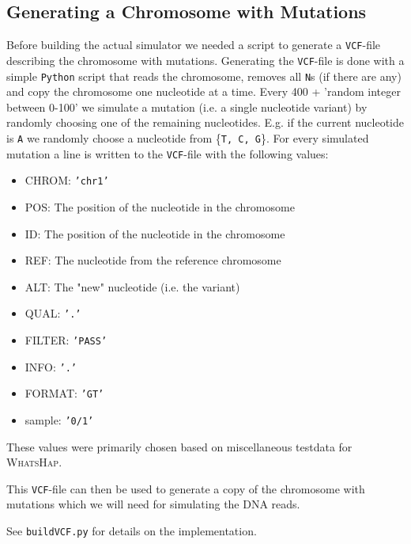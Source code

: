 \documentclass[10pt,a4paper]{article}
\begin{document}
\subsection{Generating a Chromosome with Mutations}
Before building the actual simulator we needed a script to generate a \texttt{VCF}-file describing the chromosome with mutations. Generating the \texttt{VCF}-file is done with a simple \texttt{Python} script that reads the chromosome, removes all \texttt{N}s (if there are any) and copy the chromosome one nucleotide at a time. Every 400 + 'random integer between 0-100' we simulate a mutation (i.e. a single nucleotide variant) by randomly choosing one of the remaining nucleotides. E.g. if the current nucleotide is \texttt{A} we randomly choose a nucleotide from \{\texttt{T, C, G}\}. For every simulated mutation a line is written to the \texttt{VCF}-file with the following values:
\begin{itemize}
\item CHROM: \texttt{'chr1'}
\item POS: The position of the nucleotide in the chromosome
\item ID: The position of the nucleotide in the chromosome
\item REF: The nucleotide from the reference chromosome
\item ALT: The "new" nucleotide (i.e. the variant)
\item QUAL: \texttt{'.'}
\item FILTER: \texttt{'PASS'}
\item INFO: \texttt{'.'}
\item FORMAT: \texttt{'GT'}
\item sample: \texttt{'0/1'}
\end{itemize}
These values were primarily chosen based on miscellaneous testdata for \textsc{WhatsHap}.

This \texttt{VCF}-file can then be used to generate a copy of the chromosome with mutations which we will need for simulating the DNA reads.

See \texttt{buildVCF.py} for details on the implementation.
\end{document}
